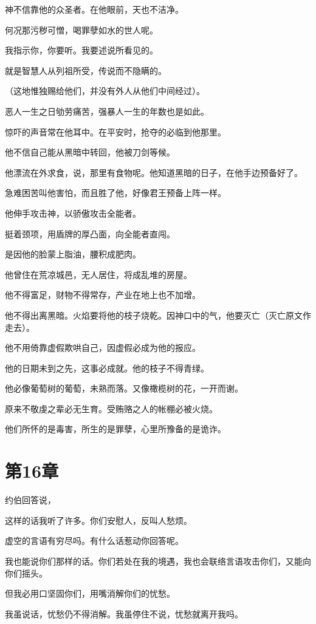 \documentclass[12pt,oneside]{book}
\begin{document}
神不信靠他的众圣者。在他眼前，天也不洁净。

何况那污秽可憎，喝罪孽如水的世人呢。

我指示你，你要听。我要述说所看见的。

就是智慧人从列祖所受，传说而不隐瞒的。

（这地惟独赐给他们，并没有外人从他们中间经过）。

恶人一生之日劬劳痛苦，强暴人一生的年数也是如此。

惊吓的声音常在他耳中。在平安时，抢夺的必临到他那里。

他不信自己能从黑暗中转回，他被刀剑等候。

他漂流在外求食，说，那里有食物呢。他知道黑暗的日子，在他手边预备好了。

急难困苦叫他害怕，而且胜了他，好像君王预备上阵一样。

他伸手攻击神，以骄傲攻击全能者。

挺着颈项，用盾牌的厚凸面，向全能者直闯。

是因他的脸蒙上脂油，腰积成肥肉。

他曾住在荒凉城邑，无人居住，将成乱堆的房屋。

他不得富足，财物不得常存，产业在地上也不加增。

他不得出离黑暗。火焰要将他的枝子烧乾。因神口中的气，他要灭亡（灭亡原文作走去）。

他不用倚靠虚假欺哄自己，因虚假必成为他的报应。

他的日期未到之先，这事必成就。他的枝子不得青绿。

他必像葡萄树的葡萄，未熟而落。又像橄榄树的花，一开而谢。

原来不敬虔之辈必无生育。受贿赂之人的帐棚必被火烧。

他们所怀的是毒害，所生的是罪孽，心里所豫备的是诡诈。



\chapter{第16章}
约伯回答说，

这样的话我听了许多。你们安慰人，反叫人愁烦。

虚空的言语有穷尽吗。有什么话惹动你回答呢。

我也能说你们那样的话。你们若处在我的境遇，我也会联络言语攻击你们，又能向你们摇头。

但我必用口坚固你们，用嘴消解你们的忧愁。

我虽说话，忧愁仍不得消解。我虽停住不说，忧愁就离开我吗。
\end{document}
